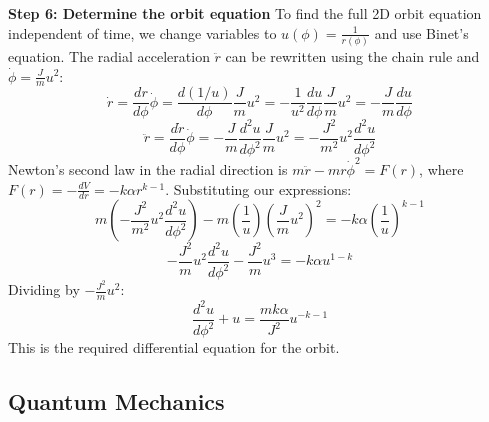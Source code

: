 \begin{solution}
\textbf{Step 6: Determine the orbit equation}
To find the full 2D orbit equation independent of time, we change variables to $u(\phi) = \frac{1}{r(\phi)}$ and use Binet's equation.
The radial acceleration $\ddot{r}$ can be rewritten using the chain rule and $\dot{\phi} = \frac{J}{m} u^2$:
\[ \dot{r} = \frac{dr}{d\phi} \dot{\phi} = \frac{d(1/u)}{d\phi} \frac{J}{m} u^2 = -\frac{1}{u^2} \frac{du}{d\phi} \frac{J}{m} u^2 = -\frac{J}{m} \frac{du}{d\phi} \]
\[ \ddot{r} = \frac{d\dot{r}}{d\phi} \dot{\phi} = -\frac{J}{m} \frac{d^2u}{d\phi^2} \frac{J}{m} u^2 = -\frac{J^2}{m^2} u^2 \frac{d^2u}{d\phi^2} \]
Newton's second law in the radial direction is $m\ddot{r} - mr\dot{\phi}^2 = F(r)$, where $F(r) = -\frac{dV}{dr} = -k\alpha r^{k-1}$.
Substituting our expressions:
\[ m \left( -\frac{J^2}{m^2} u^2 \frac{d^2u}{d\phi^2} \right) - m \left(\frac{1}{u}\right) \left(\frac{J}{m} u^2\right)^2 = -k\alpha \left(\frac{1}{u}\right)^{k-1} \]
\[ -\frac{J^2}{m} u^2 \frac{d^2u}{d\phi^2} - \frac{J^2}{m} u^3 = -k\alpha u^{1-k} \]
Dividing by $-\frac{J^2}{m} u^2$:
\[ \frac{d^2u}{d\phi^2} + u = \frac{mk\alpha}{J^2} u^{-k-1} \]
This is the required differential equation for the orbit.
\end{solution}

\subsection{Quantum Mechanics}

